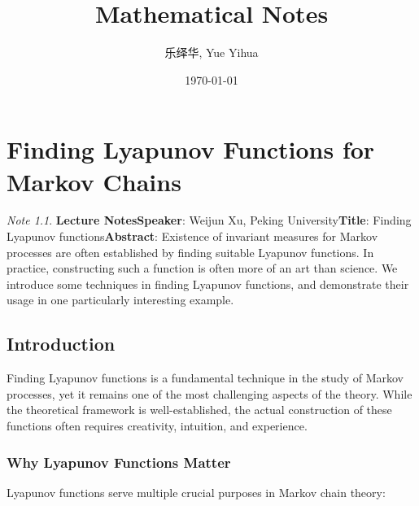 \documentclass{amsart}
\author{乐绎华, Yue Yihua}
\date{\today}
\title{Mathematical Notes}
\theoremstyle{plain}
\theoremstyle{definition}
\theoremstyle{remark}
\newtheorem{note}[theorem]{Note}
\begin{document}
\maketitle
\tableofcontents

\chapter{Finding Lyapunov Functions for Markov Chains}

\begin{note}
\textbf{Lecture Notes}\textbf{Speaker}: Weijun Xu, Peking University\textbf{Title}: Finding Lyapunov functions\textbf{Abstract}: Existence of invariant measures for Markov processes are often established by finding suitable Lyapunov functions. In practice, constructing such a function is often more of an art than science. We introduce some techniques in finding Lyapunov functions, and demonstrate their usage in one particularly interesting example.
\end{note}
\section{Introduction}

Finding Lyapunov functions is a fundamental technique in the study of Markov processes, yet it remains one of the most challenging aspects of the theory. While the theoretical framework is well-established, the actual construction of these functions often requires creativity, intuition, and experience.

\subsection{Why Lyapunov Functions Matter}

Lyapunov functions serve multiple crucial purposes in Markov chain theory:
\end{document}
